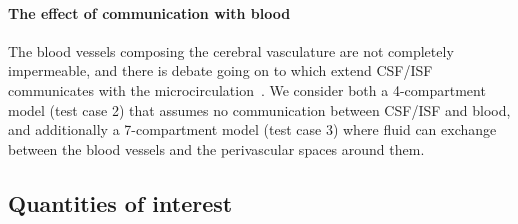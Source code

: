 \documentclass[10pt]{article}
\newcommand{\eg}{\emph{e.g.}\;}
\newcommand{\1}{^{(1)}}
\newcommand{\2}{^{(2)}}
\newcommand{\Cinulin}{$\prescript{14}{}{\text{C}}$-inulin }
\newcommand{\commentout}[1]{}
\begin{document}
\paragraph{The effect of communication with blood}
The blood vessels composing the cerebral vasculature are not completely impermeable, and there is debate going on to which extend CSF/ISF communicates with the microcirculation~\cite{Oreskovic-2010-formation}. We consider both a 4-compartment model (test case 2) that assumes no communication between CSF/ISF and blood, and additionally a 7-compartment model (test case 3) where fluid can exchange between the blood vessels and the perivascular spaces around them. 


\commentout{
\paragraph{The effect of blood vessels}
In the usual picture of the Glymphatic system, the leakage or resorption of fluid from the blood vessels is not considered. However, even though the BBB is known to be a tight selective barrier, a small amount of fluid can cross the membrane of blood vessels. The hydraulic conductivity of capillaries, arterioles and venules have been measured in different species and is known to not be zero (see \eg~\cite{fraser1990measurement, kimura1993measurement, roberts2009ppar}). We consider the effect of fluid leakage from the blood vessel in the third test case corresponding to an application of the model~\eqref{eq:main-system} with 7 compartments. The baseline parameter values for the fluid flow are given in Table~\ref{tab:fluid} and for the transfer between compartments in Table~\ref{tab:exchange}. We highlight here that no transfer of \Cinulin from PVS to the blood is considered since this molecule is known to not cross the BBB.
}
\subsection{Quantities of interest}
\end{document}
